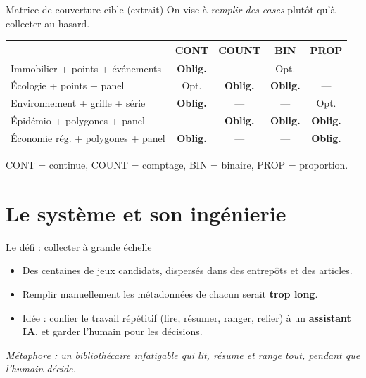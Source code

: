 \documentclass[aspectratio=169,11pt]{beamer}
\begin{document}
\begin{frame}{Matrice de couverture cible (extrait)}
\footnotesize
\centering
On vise à \emph{remplir des cases} plutôt qu'à collecter au hasard.
\vspace{0.3cm}
\begin{tabularx}{0.95\textwidth}{>{\RaggedRight\arraybackslash}p{} c c c c}
\toprule
 & \textbf{CONT} & \textbf{COUNT} & \textbf{BIN} & \textbf{PROP} \\
\midrule
Immobilier + points + événements & \textcolor{myred}{\textbf{Oblig.}} & --- & Opt. & --- \\
Écologie + points + panel & Opt. & \textcolor{myred}{\textbf{Oblig.}} & \textcolor{myred}{\textbf{Oblig.}} & --- \\
Environnement + grille + série & \textcolor{myred}{\textbf{Oblig.}} & --- & --- & Opt. \\
Épidémio + polygones + panel & --- & \textcolor{myred}{\textbf{Oblig.}} & \textcolor{myred}{\textbf{Oblig.}} & \textcolor{myred}{\textbf{Oblig.}} \\
Économie rég. + polygones + panel & \textcolor{myred}{\textbf{Oblig.}} & --- & --- & \textcolor{myred}{\textbf{Oblig.}} \\
\bottomrule
\end{tabularx}
\vspace{0.3cm}
\footnotesize CONT = continue, COUNT = comptage, BIN = binaire, PROP = proportion.
\end{frame}

\section{Le système et son ingénierie}
\begin{frame}{Le défi : collecter à grande échelle}
\begin{itemize}
    \item Des centaines de jeux candidats, dispersés dans des entrepôts et des articles.
    \vspace{0.2cm}
    \item Remplir manuellement les métadonnées de chacun serait \textbf{trop long}.
    \vspace{0.2cm}
    \item Idée : confier le travail répétitif (lire, résumer, ranger, relier) à un \textbf{assistant IA}, et garder l'humain pour les décisions.
\end{itemize}
\vspace{0.3cm}
\centering\emph{Métaphore : un bibliothécaire infatigable qui lit, résume et range tout, pendant que l'humain décide.}
\end{frame}
\end{document}
